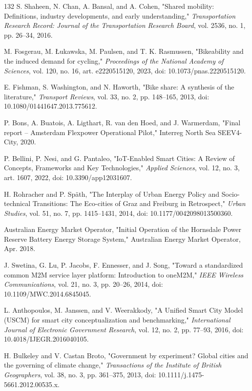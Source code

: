 \documentclass[pdflatex,sn-mathphys-num]{sn-jnl}%
\theoremstyle{thmstyleone}%
\theoremstyle{thmstyletwo}%
\theoremstyle{thmstylethree}%
\begin{document}
\begin{thebibliography}{132}
 S. Shaheen, N. Chan, A. Bansal, and A. Cohen, "Shared mobility: Definitions, industry developments, and early understanding," \emph{Transportation Research Record: Journal of the Transportation Research Board}, vol. 2536, no. 1, pp. 26--34, 2016.

 M. Fosgerau, M. \L{}ukawska, M. Paulsen, and T. K. Rasmussen, "Bikeability and the induced demand for cycling," \emph{Proceedings of the National Academy of Sciences}, vol. 120, no. 16, art. e2220515120, 2023, doi: 10.1073/pnas.2220515120.

 E. Fishman, S. Washington, and N. Haworth, "Bike share: A synthesis of the literature," \emph{Transport Reviews}, vol. 33, no. 2, pp. 148--165, 2013, doi: 10.1080/01441647.2013.775612.

 P. Bons, A. Buatois, A. Ligthart, R. van den Hoed, and J. Warmerdam, "Final report -- Amsterdam Flexpower Operational Pilot," Interreg North Sea SEEV4-City, 2020.

 P. Bellini, P. Nesi, and G. Pantaleo, "IoT-Enabled Smart Cities: A Review of Concepts, Frameworks and Key Technologies," \emph{Applied Sciences}, vol. 12, no. 3, art. 1607, 2022, doi: 10.3390/app12031607.

 H. Rohracher and P. Sp\"ath, "The Interplay of Urban Energy Policy and Socio-technical Transitions: The Eco-cities of Graz and Freiburg in Retrospect," \emph{Urban Studies}, vol. 51, no. 7, pp. 1415--1431, 2014, doi: 10.1177/0042098013500360.

 Australian Energy Market Operator, "Initial Operation of the Hornsdale Power Reserve Battery Energy Storage System," Australian Energy Market Operator, Apr. 2018.

 J. Swetina, G. Lu, P. Jacobs, F. Ennesser, and J. Song, "Toward a standardized common M2M service layer platform: Introduction to oneM2M," \emph{IEEE Wireless Communications}, vol. 21, no. 3, pp. 20--26, 2014, doi: 10.1109/MWC.2014.6845045.

 L. Anthopoulos, M. Janssen, and V. Weerakkody, "A Unified Smart City Model (USCM) for smart city conceptualization and benchmarking," \emph{International Journal of Electronic Government Research}, vol. 12, no. 2, pp. 77--93, 2016, doi: 10.4018/IJEGR.2016040105.

 H. Bulkeley and V. Castan Broto, "Government by experiment? Global cities and the governing of climate change," \emph{Transactions of the Institute of British Geographers}, vol. 38, no. 3, pp. 361--375, 2013, doi: 10.1111/j.1475-5661.2012.00535.x.


\end{thebibliography}
\end{document}
